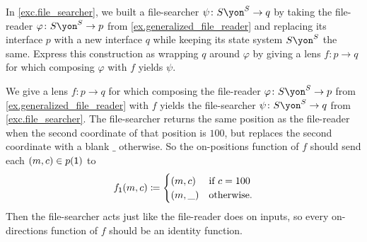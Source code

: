 \documentclass[Book-Poly]{subfiles}
\begin{document}
\begin{exercise} \label{exc.file_searcher_wrap}
In \cref{exc.file_searcher}, we built a file-searcher $\psi\colon S\yon^S\to q$ by taking the file-reader $\varphi\colon S\yon^S\to p$ from \cref{ex.generalized_file_reader} and replacing its interface $p$ with a new interface $q$ while keeping its state system $S\yon^S$ the same.
Express this construction as wrapping $q$ around $\varphi$ by giving a lens $f\colon p\to q$ for which composing $\varphi$ with $f$ yields $\psi$.
\begin{solution}
We give a lens $f\colon p\to q$ for which composing the file-reader $\varphi\colon S\yon^S\to p$ from \cref{ex.generalized_file_reader} with $f$ yields the file-searcher $\psi\colon S\yon^S\to q$ from \cref{exc.file_searcher}.
The file-searcher returns the same position as the file-reader when the second coordinate of that position is $100$, but replaces the second coordinate with a blank $\_$ otherwise.
So the on-positions function of $f$ should send each $(m,c)\in p(\textsf{1})$ to
\[
    f_{\textsf{1}}(m,c) \coloneqq
        \begin{cases}
            (m,c) & \text{if } c = 100 \\
            (m,\_) & \text{otherwise}.
        \end{cases}
\]
Then the file-searcher acts just like the file-reader does on inputs, so every on-directions function of $f$ should be an identity function.
\end{solution}
\end{exercise}
\end{document}
